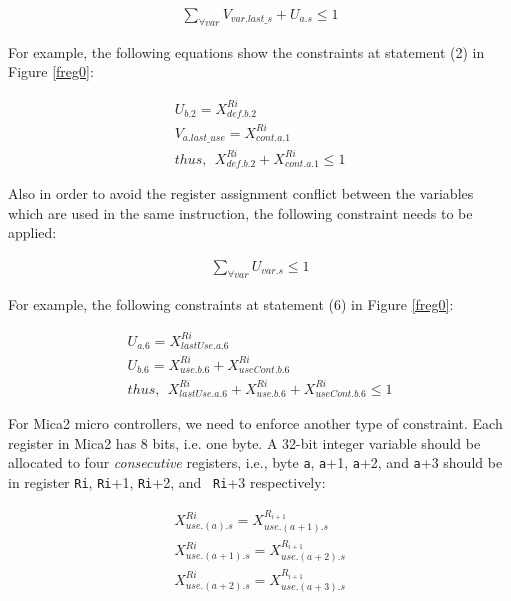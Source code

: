 \begin{small}
\begin{eqnarray}
\sum_{\forall var}V_{var.last\_s} + U_{a.s} \leq 1 
\end{eqnarray}
\end{small}

For example, the following equations show the constraints at statement (2) in
Figure \ref{freg0}:
\begin{small}
\begin{eqnarray}
U_{b.2} = X_{def.b.2}^{Ri}\nonumber\\
V_{a.last\_use} = X_{cont.a.1}^{Ri}\nonumber \\
thus, ~~X_{def.b.2}^{Ri} + X_{cont.a.1}^{Ri} \leq 1
\end{eqnarray}
\end{small}

Also in order to avoid the register assignment conflict between the variables which
are used in the same instruction, the following constraint needs to be applied:
\begin{small}
\begin{eqnarray}
\sum_{\forall var}U_{var.s} \leq 1 
\end{eqnarray}
\end{small}

For example, the following constraints at statement (6) in Figure \ref{freg0}:

\begin{small}
\begin{eqnarray}
U_{a.6} = X_{lastUse.a.6}^{Ri}\nonumber\\
U_{b.6} = X_{use.b.6}^{Ri} + X_{useCont.b.6}^{Ri} \nonumber\\
thus, ~~X_{lastUse.a.6}^{Ri} + X_{use.b.6}^{Ri} + X_{useCont.b.6}^{Ri} \leq 1
\end{eqnarray}
\end{small}

For Mica2 micro controllers, we need to enforce another type of
constraint. Each register in Mica2 has 8 bits, i.e. one byte. A
32-bit integer variable should be allocated to four {\em
consecutive} registers, i.e., byte {\tt a}, {\tt a}+1, {\tt a}+2, and
{\tt a}+3 should be in register {\tt Ri}, {\tt Ri}+1, {\tt Ri}+2, and {\tt
Ri}+3 respectively:

\begin{small}
\begin{eqnarray}
X_{use.(a).s}^{Ri} = X_{use.(a+1).s}^{R_{i+1}} \nonumber \\
X_{use.(a+1).s}^{Ri} = X_{use.(a+2).s}^{R_{i+1}} \nonumber \\
X_{use.(a+2).s}^{Ri} = X_{use.(a+3).s}^{R_{i+1}} 
\end{eqnarray} 
\end{small}

